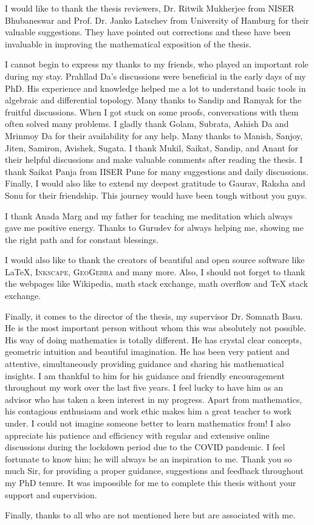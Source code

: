 \vspace{0.3cm}
\hf I would like to thank the thesis reviewers, Dr.  Ritwik Mukherjee from NISER Bhubaneswar and Prof. Dr. Janko Latschev from University of Hamburg for their valuable suggestions. They have pointed out corrections and these have been invaluable in improving the mathematical exposition of the thesis.

\vspace{0.3cm} 
\hf I cannot begin to express my thanks to my friends, who played an important role during my stay. Prahllad Da's discussions were beneficial in the early days of my PhD. His experience and knowledge helped me a lot to understand basic tools in algebraic and differential topology. Many thanks to Sandip and Ramyak for the fruitful discussions. When I got stuck on some proofs, conversations with them often solved many problems. I gladly thank Golam, Subrata, Ashish Da and Mrinmoy Da for their availability for any help. Many thanks to Manish, Sanjoy, Jiten, Samiron, Avishek, Sugata. I thank Mukil, Saikat, Sandip, and Anant for their helpful discussions and make valuable comments after reading the thesis. I thank Saikat Panja from IISER Pune for many suggestions and daily discussions. Finally, I would also like to extend my deepest gratitude to Gaurav, Raksha and Sonu for their friendship. This journey would have been tough without you guys.

\vspace{0.3cm}
\hf I thank Anada Marg and my father for teaching me meditation which always gave me positive energy. Thanks to Gurudev for always helping me, showing me the right path and for constant blessings.

\vspace{0.3cm} 
\hf I would also like to thank the creators of beautiful and open source software like \LaTeX, \textsc{Inkscape}, \textsc{GeoGebra} and many more. Also, I should not forget to thank the webpages like Wikipedia, math stack exchange, math overflow and TeX stack exchange. 

\vspace{0.3cm} 
\hf Finally, it comes to the director of the thesis, my supervisor Dr. Somnath Basu. He is the most important person without whom this was absolutely not possible. His way of doing mathematics is totally different. He has crystal clear concepts, geometric intuition and beautiful imagination. He has been very patient and attentive, simultaneously providing guidance and sharing his mathematical insights. I am thankful to him for his guidance and friendly encouragement throughout my work over the last five years. I feel lucky to have him as an advisor who has taken a keen interest in my progress. Apart from mathematics, his contagious enthusiasm and work ethic makes him a great teacher to work under. I could not imagine someone better to learn mathematics from! I also appreciate his patience and efficiency with regular and extensive online discussions during the lockdown period due to the COVID pandemic. I feel fortunate to know him; he will always be an inspiration to me. Thank you so much Sir, for providing a proper guidance, suggestions and feedback throughout my PhD tenure. It was impossible for me to complete this thesis without your support and supervision.

\vspace{0.3cm}
\hf Finally, thanks to all who are not mentioned here but are associated with me.


